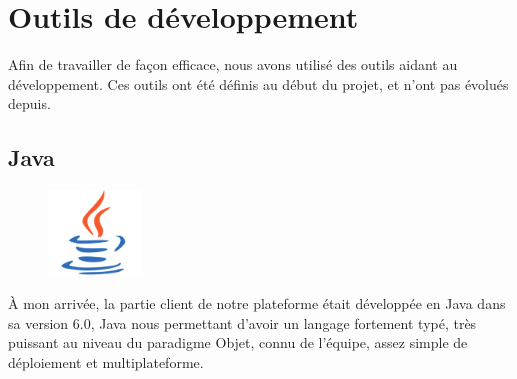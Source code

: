 %
%
%
\section{Outils de développement}
Afin de travailler de façon efficace, nous avons utilisé des outils aidant au développement. Ces outils ont été définis au début du projet, et n'ont pas évolués depuis.

\subsection{Java}
\begin{figure}
	\includegraphics[width=2.5cm]{contents/images/logoJava.png}
\end{figure}
À mon arrivée, la partie client de notre plateforme était développée en Java dans sa version 6.0, Java nous permettant d'avoir un langage fortement typé, très puissant au niveau du paradigme Objet, connu de l'équipe, assez simple de déploiement et multiplateforme. 

